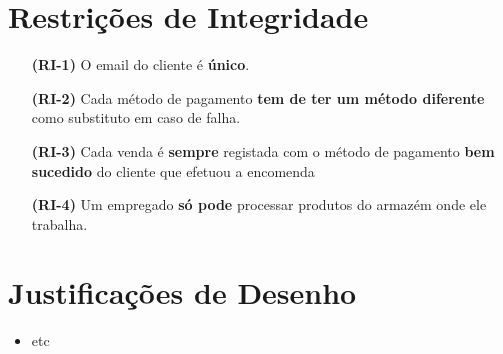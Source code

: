 \documentclass[12pt,a4paper]{article}
\begin{document}
  \section*{Restrições de Integridade}
  \footnotesize
  \begin{itemize}
    \item[\textbf{(RI-1)}] O email do cliente é \textbf{único}.
    \item[\textbf{(RI-2)}] Cada método de pagamento \textbf{tem de ter um método diferente} como substituto em caso de falha.
    \item[\textbf{(RI-3)}] Cada venda é \textbf{sempre} registada com o método de pagamento \textbf{bem sucedido} do cliente que efetuou a encomenda
    \item[\textbf{(RI-4)}] Um empregado \textbf{só pode} processar produtos do armazém onde ele trabalha.

  \end{itemize}

  \section*{Justificações de Desenho}
  \normalsize
  \begin{itemize}
    \item etc
  \end{itemize}
\end{document}
